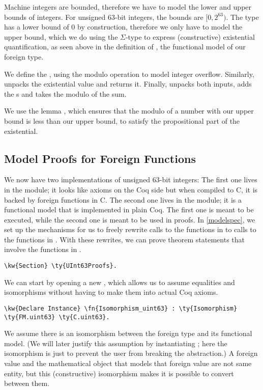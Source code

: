 Machine integers are bounded, therefore we have to model the lower and upper bounds of integers. For unsigned 63-bit integers, the bounds are $[0,2^{63})$. The  type has a lower bound of $0$ by construction, therefore we only have to model the upper bound, which we do using the $\Sigma$-type to express (constructive) existential quantification, as seen above in the definition of , the \gls{functional model} of our \gls{foreign type}.

We define the , using the modulo operation to model integer overflow. Similarly,  unpacks the existential value and returns it. Finally,  unpacks both inputs, adds the s and takes the modulo of the sum.

We use the lemma , which ensures that the modulo of a number with our upper bound is less than our upper bound, to satisfy the propositional part of the existential.

\subsection{Model Proofs for Foreign Functions}

We now have two implementations of unsigned 63-bit integers: The first one lives in the  module; it looks like axioms on the Coq side but when compiled to C, it is backed by \gls{foreign function}s in C. The second one lives in the  module; it is a \gls{functional model} that is implemented in plain Coq. The first one is meant to be executed, while the second one is meant to be used in proofs. In \autoref{modelspec}, we set up the mechanisms for us to freely rewrite calls to the functions in  to calls to the functions in . With these rewrites, we can prove theorem statements that involve the functions in .

\begin{Verbatim}
\kw{Section} \ty{UInt63Proofs}.
\end{Verbatim}

We can start by opening a new , which allows us to assume equalities and isomorphisms without having to make them into actual Coq axioms.

\begin{Verbatim}
\kw{Declare Instance} \fn{Isomorphism_uint63} : \ty{Isomorphism} \ty{FM.uint63} \ty{C.uint63}.
\end{Verbatim}

We assume there is an isomorphism between the \gls{foreign type} and its \gls{functional model}. (We will later justify this assumption by instantiating ; here the isomorphism is just to prevent the user from breaking the abstraction.) A foreign value and the mathematical object that models that foreign value are not same entity, but this (constructive) isomorphism makes it is possible to convert between them.

